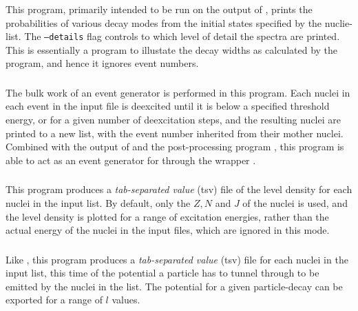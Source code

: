 \subsubsection{}
This program, primarily intended to be run on the output of , prints the probabilities of various decay modes from the initial states specified by the nuclie-list. The \texttt{--details} flag controls to which level of detail the spectra are printed. This is essentially a program to illustate the decay widths as calculated by the program, and hence it ignores event numbers.

\subsubsection{}
The bulk work of an event generator is performed in this program. Each nuclei in each event in the input file is deexcited until it is below a specified threshold energy, or for a given number of deexcitation steps, and the resulting nuclei are printed to a new list, with the event number inherited from their mother nuclei. Combined with the output of  and the post-processing program , this program is able to act as an event generator for  through the wrapper .

\subsubsection{}
This program produces a \emph{tab-separated value} (tsv) file of the level density for each nuclei in the input list. By default, only the $Z, N$ and $J$ of the nuclei is used, and the level density is plotted for a range of excitation energies, rather than the actual energy of the nuclei in the input files, which are ignored in this mode.

\subsubsection{}
Like , this program produces a \emph{tab-separated value} (tsv) file for each nuclei in the input list, this time of the potential a particle has to tunnel through to be emitted by the nuclei in the list. The potential for a given particle-decay can be exported for a range of $l$ values.


